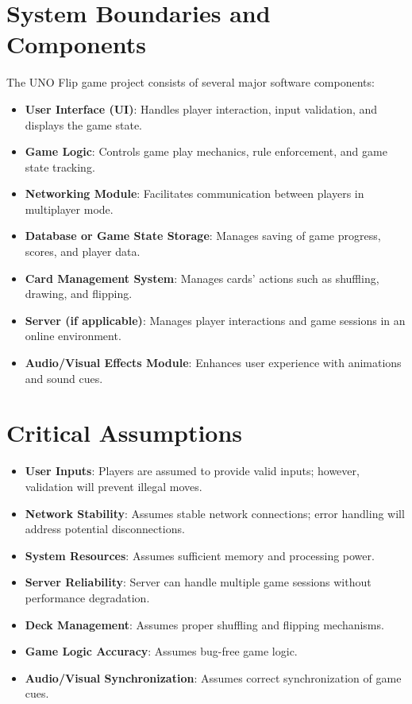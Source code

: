 \documentclass[12pt]{article}
\begin{document}
\section{System Boundaries and Components}
The UNO Flip game project consists of several major software components:
\begin{itemize}
    \item \textbf{User Interface (UI)}: Handles player interaction, input validation, and displays the game state.
    \item \textbf{Game Logic}: Controls game play mechanics, rule enforcement, and game state tracking.
    \item \textbf{Networking Module}: Facilitates communication between players in multiplayer mode.
    \item \textbf{Database or Game State Storage}: Manages saving of game progress, scores, and player data.
    \item \textbf{Card Management System}: Manages cards' actions such as shuffling, drawing, and flipping.
    \item \textbf{Server (if applicable)}: Manages player interactions and game sessions in an online environment.
    \item \textbf{Audio/Visual Effects Module}: Enhances user experience with animations and sound cues.
\end{itemize}

\section{Critical Assumptions}
\begin{itemize}
    \item \textbf{User Inputs}: Players are assumed to provide valid inputs; however, validation will prevent illegal moves.
    \item \textbf{Network Stability}: Assumes stable network connections; error handling will address potential disconnections.
    \item \textbf{System Resources}: Assumes sufficient memory and processing power.
    \item \textbf{Server Reliability}: Server can handle multiple game sessions without performance degradation.
    \item \textbf{Deck Management}: Assumes proper shuffling and flipping mechanisms.
    \item \textbf{Game Logic Accuracy}: Assumes bug-free game logic.
    \item \textbf{Audio/Visual Synchronization}: Assumes correct synchronization of game cues.
\end{itemize}
\end{document}
